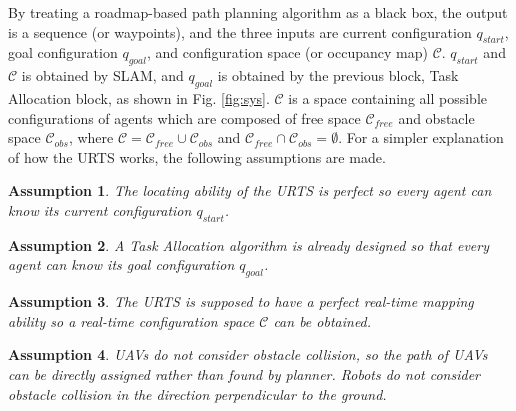 \documentclass[journal,12pt,onecolumn,draftclsnofoot,]{IEEEtran}
\newtheorem{assumption}{Assumption}[section]
\begin{document}

By treating a roadmap-based path planning algorithm as a black box, the output is a sequence (or waypoints), and the three inputs are current configuration $q_{start}$, goal configuration $q_{goal}$, and configuration space (or occupancy map) $\mathcal{C}$. $q_{start}$ and $\mathcal{C}$ is obtained by SLAM, and $q_{goal}$ is obtained by the previous block, Task Allocation block, as shown in Fig. \ref{fig:sys}. $\mathcal{C}$ is a space containing all possible configurations of agents which are composed of free space $\mathcal{C}_{free}$ and obstacle space $\mathcal{C}_{obs}$, where $\mathcal{C}=\mathcal{C}_{free}\cup\mathcal{C}_{obs}$ and $\mathcal{C}_{free}\cap\mathcal{C}_{obs}=\emptyset$. For a simpler explanation of how the URTS works, the following assumptions are made.

\begin{assumption}
    The locating ability of the URTS is perfect so every agent can know its current configuration $q_{start}$.
\end{assumption}
\begin{assumption}
    A Task Allocation algorithm is already designed so that every agent can know its goal configuration $q_{goal}$.
\end{assumption}
\begin{assumption}
    The URTS is supposed to have a perfect real-time mapping ability so a real-time configuration space $\mathcal{C}$ can be obtained.
\end{assumption}
\begin{assumption} \label{asm:collision} %
    UAVs do not consider obstacle collision, so the path of UAVs can be directly assigned rather than found by planner. Robots do not consider obstacle collision in the direction perpendicular to the ground. 
\end{assumption}
\end{document}
